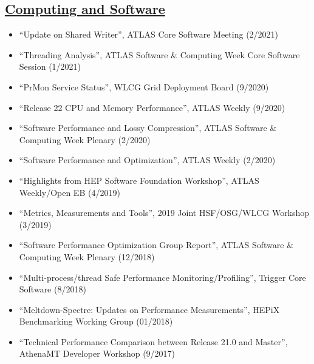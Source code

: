 \documentclass[a4paper,10pt]{article}
\begin{document}
\subsection{\underline{Computing and Software}}
\vspace{1mm}
\begin{itemize}
	\item ``Update on Shared Writer'', ATLAS Core Software Meeting (2/2021)
	\item ``Threading Analysis'', ATLAS Software \& Computing Week Core Software Session (1/2021)
	\item ``PrMon Service Status'', WLCG Grid Deployment Board (9/2020)
	\item ``Release 22 CPU and Memory Performance'', ATLAS Weekly (9/2020)
	\item ``Software Performance and Lossy Compression'', ATLAS Software \& Computing Week Plenary (2/2020)
	\item ``Software Performance and Optimization'', ATLAS Weekly (2/2020)
	\item ``Highlights from HEP Software Foundation Workshop'', ATLAS Weekly/Open EB (4/2019)
	\item ``Metrics, Measurements and Tools'', 2019 Joint HSF/OSG/WLCG Workshop (3/2019)
	\item ``Software Performance Optimization Group Report'', ATLAS Software \& Computing Week Plenary (12/2018) 
	\item ``Multi-process/thread Safe Performance Monitoring/Profiling'', Trigger Core Software (8/2018)
	\item ``Meltdown-Spectre: Updates on Performance Measurements'', HEPiX Benchmarking Working Group (01/2018)
	\item ``Technical Performance Comparison between Release 21.0 and Master'', AthenaMT Developer Workshop (9/2017)
\end{itemize}
\vspace{1mm}
\end{document}
